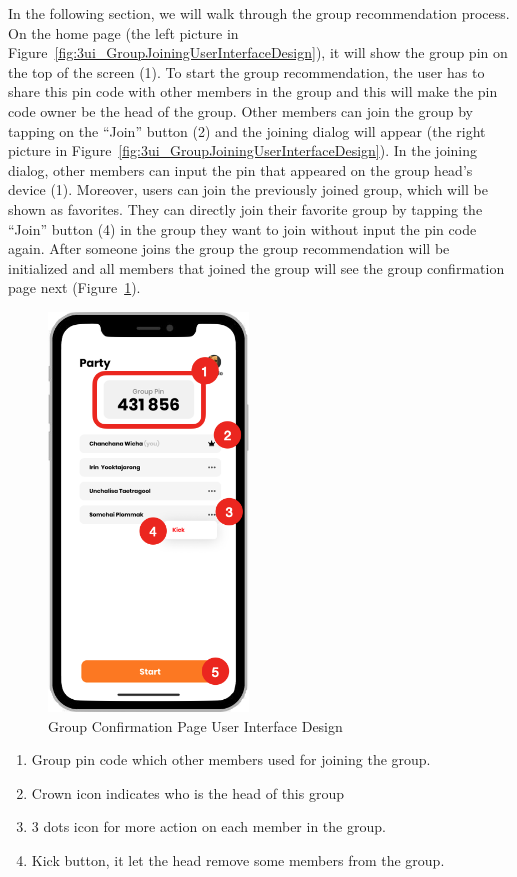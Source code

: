 \documentclass[12pt,oneside,openright,a4paper]{cpe-english-project}
\begin{document}
In the following section, we will walk through the group recommendation process. On the home page (the left picture in Figure~\ref{fig:3ui_GroupJoiningUserInterfaceDesign}), it will show the group pin on the top of the screen (1). To start the group recommendation, the user has to share this pin code with other members in the group and this will make the pin code owner be the head of the group. Other members can join the group by tapping on the “Join” button (2) and the joining dialog will appear (the right picture in Figure~\ref{fig:3ui_GroupJoiningUserInterfaceDesign}). In the joining dialog, other members can input the pin that appeared on the group head’s device (1). Moreover, users can join the previously joined group, which will be shown as favorites. They can directly join their favorite group by tapping the “Join” button (4) in the group they want to join without input the pin code again. After someone joins the group the group recommendation will be initialized and all members that joined the group will see the group confirmation page next (Figure~\ref{fig:3ui_GroupConfirmationPageUserInterfaceDesign}).

\newpage
\begin{figure}[H]\centering
\includegraphics[height=300pt]{./images/3ui_GroupConfirmationPageUserInterfaceDesign.png}
\caption{Group Confirmation Page User Interface Design}\label{fig:3ui_GroupConfirmationPageUserInterfaceDesign}
\end{figure}

\begin{enumerate}
\item Group pin code which other members used for joining the group.
\item Crown icon indicates who is the head of this group
\item 3 dots icon for more action on each member in the group.
\item Kick button, it let the head remove some members from the group.
\end{enumerate}
\end{document}
